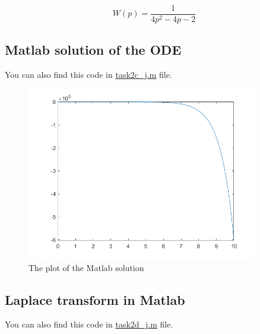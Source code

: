 \documentclass{article}
\begin{document}
   	\begin{equation}
        W(p) = \frac{1}{4p^2 - 4p - 2}
    \end{equation}
    
    \subsection{Matlab solution of the ODE}
    You can also find this code in \href{run:task2c\_j.m}{task2c\_j.m} file.
    
    \begin{figure}[ht]
        \centering
        \includegraphics[width=0.9\textwidth]{images/solution2c_j.png}
        \caption{The plot of the Matlab solution}
        \label{fig:plot1c}
    \end{figure}
    
    \subsection{Laplace transform in Matlab}
    You can also find this code in \href{run:task2d\_j.m}{task2d\_j.m} file.
    
 
\end{document}
